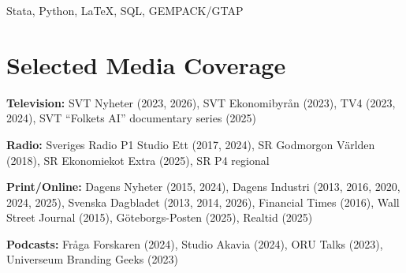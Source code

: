 \documentclass[11pt,a4paper]{article}
\begin{document}
Stata, Python, \LaTeX, SQL, GEMPACK/GTAP

\section{Selected Media Coverage}

\textbf{Television:} SVT Nyheter (2023, 2026), SVT Ekonomibyrån (2023), TV4 (2023, 2024), SVT ``Folkets AI'' documentary series (2025)

\vspace{4pt}
\textbf{Radio:} Sveriges Radio P1 Studio Ett (2017, 2024), SR Godmorgon Världen (2018), SR Ekonomiekot Extra (2025), SR P4 regional

\vspace{4pt}
\textbf{Print/Online:} Dagens Nyheter (2015, 2024), Dagens Industri (2013, 2016, 2020, 2024, 2025), Svenska Dagbladet (2013, 2014, 2026), Financial Times (2016), Wall Street Journal (2015), Göteborgs-Posten (2025), Realtid (2025)

\vspace{4pt}
\textbf{Podcasts:} Fråga Forskaren (2024), Studio Akavia (2024), ORU Talks (2023), Universeum Branding Geeks (2023)

\end{document}
